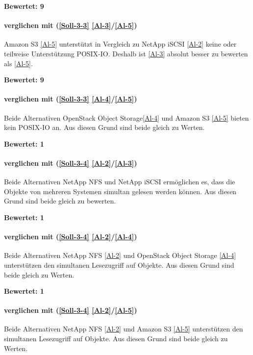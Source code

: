 \textbf{Bewertet: 9}

\paragraph*{  verglichen mit  (\ref{Soll-3-3} \ref{Al-3}/\ref{Al-5})}
Amazon S3 \ref{Al-5} unterstützt in Vergleich zu NetApp iSCSI \ref{Al-2} keine oder teilweise Unterstützung POSIX-IO. Deshalb ist \ref{Al-3} absolut besser zu bewerten als \ref{Al-5}.

\textbf{Bewertet: 9}


\paragraph*{  verglichen mit  (\ref{Soll-3-3} \ref{Al-4}/\ref{Al-5})}
Beide Alternativen OpenStack Object Storage\ref{Al-4} und Amazon S3 \ref{Al-5} bieten kein POSIX-IO an. Aus diesen Grund sind beide gleich zu Werten.

\textbf{Bewertet: 1}

\paragraph*{  verglichen mit  (\ref{Soll-3-4} \ref{Al-2}/\ref{Al-3})}
Beide Alternativen NetApp NFS  und NetApp iSCSI  ermöglichen es, dass die Objekte von mehreren Systemen simultan gelesen werden können. Aus diesen Grund sind beide gleich zu bewerten.

\textbf{Bewertet: 1}

\paragraph*{  verglichen mit  (\ref{Soll-3-4} \ref{Al-2}/\ref{Al-4})}
Beide Alternativen NetApp NFS \ref{Al-2} und OpenStack Object Storage \ref{Al-4} unterstützen den simultanen Lesezugriff auf Objekte. Aus diesen Grund sind beide gleich zu Werten.

\textbf{Bewertet: 1}

\paragraph*{  verglichen mit  (\ref{Soll-3-4} \ref{Al-2}/\ref{Al-5})}
Beide Alternativen NetApp NFS \ref{Al-2} und Amazon S3 \ref{Al-5} unterstützen den simultanen Lesezugriff auf Objekte. Aus diesen Grund sind beide gleich zu Werten.

